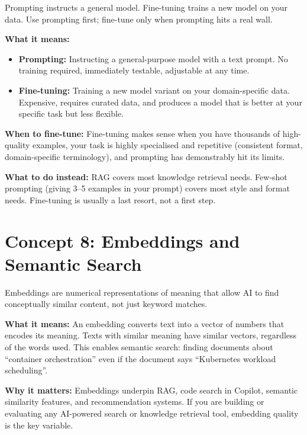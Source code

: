 \begin{conceptbox}
Prompting instructs a general model. Fine-tuning trains a new model on your data.
Use prompting first; fine-tune only when prompting hits a real wall.
\end{conceptbox}

\textbf{What it means:}
\begin{itemize}
  \item \textbf{Prompting:} Instructing a general-purpose model with a text prompt.
    No training required, immediately testable, adjustable at any time.
  \item \textbf{Fine-tuning:} Training a new model variant on your domain-specific data.
    Expensive, requires curated data, and produces a model that is better at your
    specific task but less flexible.
\end{itemize}

\textbf{When to fine-tune:}
Fine-tuning makes sense when you have thousands of high-quality examples, your task
is highly specialised and repetitive (consistent format, domain-specific terminology),
and prompting has demonstrably hit its limits.

\textbf{What to do instead:} RAG covers most knowledge retrieval needs.
Few-shot prompting (giving 3--5 examples in your prompt) covers most style and format
needs.
Fine-tuning is usually a last resort, not a first step.

\section{Concept 8: Embeddings and Semantic Search}
\label{sec:embeddings}

\begin{conceptbox}
Embeddings are numerical representations of meaning that allow AI to find
conceptually similar content, not just keyword matches.
\end{conceptbox}

\textbf{What it means:}
An embedding converts text into a vector of numbers that encodes its meaning.
Texts with similar meaning have similar vectors, regardless of the words used.
This enables semantic search: finding documents about ``container orchestration'' even if
the document says ``Kubernetes workload scheduling''.

\textbf{Why it matters:}
Embeddings underpin RAG, code search in Copilot, semantic similarity features, and
recommendation systems.
If you are building or evaluating any AI-powered search or knowledge retrieval tool,
embedding quality is the key variable.

